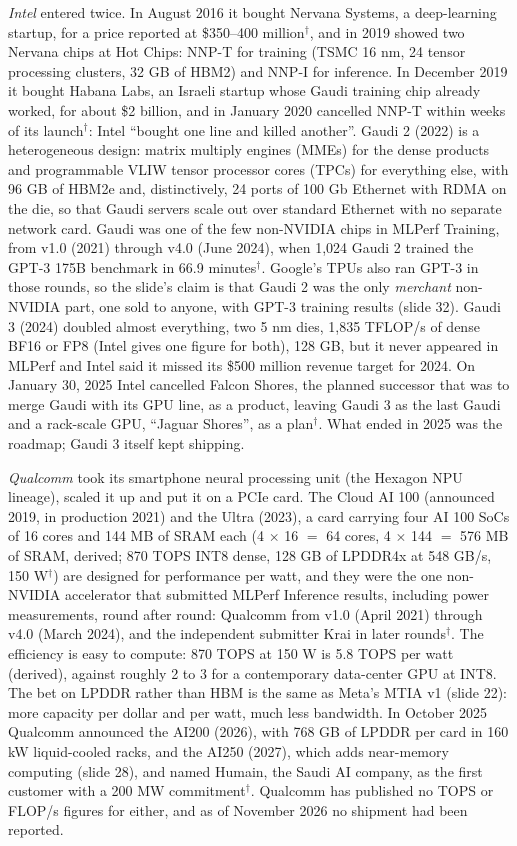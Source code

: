\documentclass[11pt,letterpaper]{article}
\begin{document}
\emph{Intel} entered twice. In August 2016 it bought Nervana Systems, a deep-learning startup, for a price reported at \$350--400 million$^\dagger$, and in 2019 showed two Nervana chips at Hot Chips: NNP-T for training (TSMC 16 nm, 24 tensor processing clusters, 32 GB of HBM2) and NNP-I for inference. In December 2019 it bought Habana Labs, an Israeli startup whose Gaudi training chip already worked, for about \$2 billion, and in January 2020 cancelled NNP-T within weeks of its launch$^\dagger$: Intel ``bought one line and killed another''. Gaudi 2 (2022) is a heterogeneous design: matrix multiply engines (MMEs) for the dense products and programmable VLIW tensor processor cores (TPCs) for everything else, with 96 GB of HBM2e and, distinctively, 24 ports of 100 Gb Ethernet with RDMA on the die, so that Gaudi servers scale out over standard Ethernet with no separate network card. Gaudi was one of the few non-NVIDIA chips in MLPerf Training, from v1.0 (2021) through v4.0 (June 2024), when 1{,}024 Gaudi 2 trained the GPT-3 175B benchmark in 66.9 minutes$^\dagger$. Google's TPUs also ran GPT-3 in those rounds, so the slide's claim is that Gaudi 2 was the only \emph{merchant} non-NVIDIA part, one sold to anyone, with GPT-3 training results (slide 32). Gaudi 3 (2024) doubled almost everything, two 5 nm dies, 1{,}835 TFLOP/s of dense BF16 or FP8 (Intel gives one figure for both), 128 GB, but it never appeared in MLPerf and Intel said it missed its \$500 million revenue target for 2024. On January 30, 2025 Intel cancelled Falcon Shores, the planned successor that was to merge Gaudi with its GPU line, as a product, leaving Gaudi 3 as the last Gaudi and a rack-scale GPU, ``Jaguar Shores'', as a plan$^\dagger$. What ended in 2025 was the roadmap; Gaudi 3 itself kept shipping.

\emph{Qualcomm} took its smartphone neural processing unit (the Hexagon NPU lineage), scaled it up and put it on a PCIe card. The Cloud AI 100 (announced 2019, in production 2021) and the Ultra (2023), a card carrying four AI 100 SoCs of 16 cores and 144 MB of SRAM each (4 $\times$ 16 $=$ 64 cores, 4 $\times$ 144 $=$ 576 MB of SRAM, derived; 870 TOPS INT8 dense, 128 GB of LPDDR4x at 548 GB/s, 150 W$^\dagger$) are designed for performance per watt, and they were the one non-NVIDIA accelerator that submitted MLPerf Inference results, including power measurements, round after round: Qualcomm from v1.0 (April 2021) through v4.0 (March 2024), and the independent submitter Krai in later rounds$^\dagger$. The efficiency is easy to compute: 870 TOPS at 150 W is 5.8 TOPS per watt (derived), against roughly 2 to 3 for a contemporary data-center GPU at INT8. The bet on LPDDR rather than HBM is the same as Meta's MTIA v1 (slide 22): more capacity per dollar and per watt, much less bandwidth. In October 2025 Qualcomm announced the AI200 (2026), with 768 GB of LPDDR per card in 160 kW liquid-cooled racks, and the AI250 (2027), which adds near-memory computing (slide 28), and named Humain, the Saudi AI company, as the first customer with a 200 MW commitment$^\dagger$. Qualcomm has published no TOPS or FLOP/s figures for either, and as of November 2026 no shipment had been reported.
\end{document}
